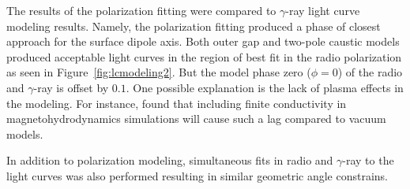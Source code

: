The results of the polarization fitting were compared to 
$\gamma$-ray light curve modeling results.  Namely,
the polarization fitting produced a phase of closest approach for 
the surface dipole axis.  Both outer gap and two-pole caustic
models produced acceptable light curves in the region
of best fit in the radio polarization as seen in
Figure~\ref{fig:lcmodeling2}.  But the 
model phase zero ($\phi=0$) of the radio and $\gamma$-ray is offset by
$0.1$.  One possible explanation is the lack of 
plasma effects in the modeling.  
For instance, \cite{kalapotharakos2012gamma}
found that including finite conductivity in
magnetohydrodynamics simulations will cause such
a lag compared to vacuum models.

In addition to polarization modeling,
simultaneous fits in radio and $\gamma$-ray
to the light curves
was also performed resulting in
similar geometric angle constrains.

